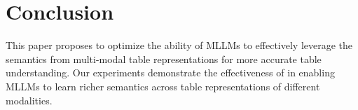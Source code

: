 \section{Conclusion}
This paper proposes \method{} to optimize the ability of MLLMs to effectively leverage the semantics from multi-modal table representations for more accurate table understanding. Our experiments demonstrate the effectiveness of \method{} in enabling MLLMs to learn richer semantics across table representations of different modalities.



